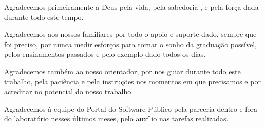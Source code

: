 \begin{agradecimentos}
Agradecemos primeiramente a Deus pela vida, pela sabedoria , e pela força dada durante todo este tempo.

Agradecemos aos nossos familiares por todo o apoio e suporte dado, sempre que foi preciso, por nunca medir esforços para tornar o sonho da graduação possível, pelos ensinamentos passados e pelo exemplo dado todos os dias.

Agradecemos também ao nosso orientador, por nos guiar durante todo este trabalho, pela paciência e pela instruções nos momentos em que precisamos e por acreditar no potencial do nosso trabalho.

Agradecemos à equipe do Portal do Software Público pela parceria dentro e fora do laboratório nesses últimos meses, pelo auxílio nas tarefas realizadas.
\end{agradecimentos}